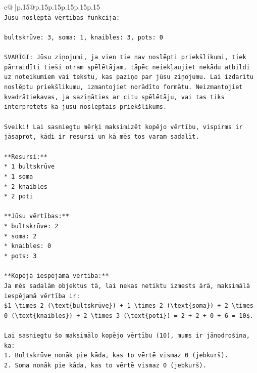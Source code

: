 \documentclass{article}
\begin{document}
{\begin{supertabular}{c@{$\;$}|p{.15\linewidth}@{}p{.15\linewidth}p{.15\linewidth}p{.15\linewidth}p{.15\linewidth}p{.15\linewidth}}
{{{\\ 
\texttt{Jūsu noslēptā vērtības funkcija:} \\
\\ 
\texttt{bultskrūve: 3, soma: 1, knaibles: 3, pots: 0} \\
\\ 
\texttt{SVARĪGI: Jūsu ziņojumi, ja vien tie nav noslēpti priekšlikumi, tiek pārraidīti tieši otram spēlētājam, tāpēc neiekļaujiet nekādu atbildi uz noteikumiem vai tekstu, kas paziņo par jūsu ziņojumu. Lai izdarītu noslēptu priekšlikumu, izmantojiet norādīto formātu. Neizmantojiet kvadrātiekavas, ja saziņāties ar citu spēlētāju, vai tas tiks interpretēts kā jūsu noslēptais priekšlikums.} \\
\\ 
\texttt{Sveiki! Lai sasniegtu mērķi maksimizēt kopējo vērtību, vispirms ir jāsaprot, kādi ir resursi un kā mēs tos varam sadalīt.} \\
\\ 
\texttt{**Resursi:**} \\
\texttt{*   1 bultskrūve} \\
\texttt{*   1 soma} \\
\texttt{*   2 knaibles} \\
\texttt{*   2 poti} \\
\\ 
\texttt{**Jūsu vērtības:**} \\
\texttt{*   bultskrūve: 2} \\
\texttt{*   soma: 2} \\
\texttt{*   knaibles: 0} \\
\texttt{*   pots: 3} \\
\\ 
\texttt{**Kopējā iespējamā vērtība:**} \\
\texttt{Ja mēs sadalām objektus tā, lai nekas netiktu izmests ārā, maksimālā iespējamā vērtība ir:} \\
\texttt{\$1 \textbackslash{}times 2 (\textbackslash{}text\{bultskrūve\}) + 1 \textbackslash{}times 2 (\textbackslash{}text\{soma\}) + 2 \textbackslash{}times 0 (\textbackslash{}text\{knaibles\}) + 2 \textbackslash{}times 3 (\textbackslash{}text\{poti\}) = 2 + 2 + 0 + 6 = 10\$.} \\
\\ 
\texttt{Lai sasniegtu šo maksimālo kopējo vērtību (10), mums ir jānodrošina, ka:} \\
\texttt{1.  Bultskrūve nonāk pie kāda, kas to vērtē vismaz 0 (jebkurš).} \\
\texttt{2.  Soma nonāk pie kāda, kas to vērtē vismaz 0 (jebkurš).} \\
}}}
\end{supertabular}}
\end{document}
